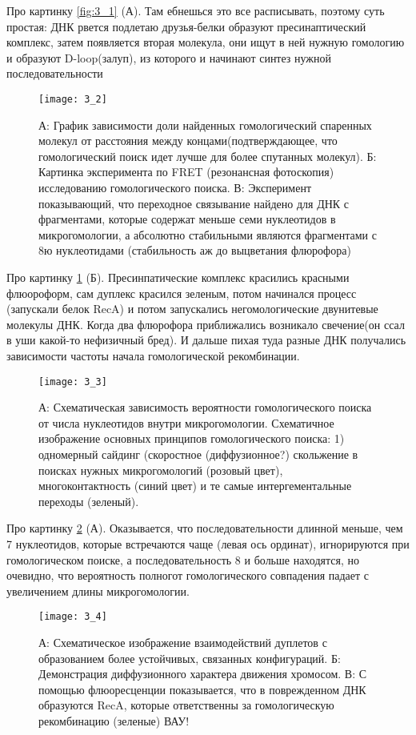 Про картинку \ref{fig:3_1}  (А). Там ебнешься это все расписывать, поэтому суть простая: ДНК рвется подлетаю друзья-белки образуют пресинаптический комплекс, затем появляется вторая молекула, они ищут в ней нужную гомологию и образуют D-loop(залуп), из которого и начинают синтез нужной последовательности

\begin{figure}[H]
	\centering
	\texttt{[image: 3\_2]}
	\caption{А: График зависимости доли найденных гомологический спаренных молекул от расстояния между концами(подтверждающее, что гомологический поиск идет лучше для более спутанных молекул). Б: Картинка эксперимента по FRET (резонансная фотоскопия) исследованию гомологического поиска. В: Эксперимент показывающий, что переходное связывание найдено для ДНК с фрагментами, которые содержат меньше семи нуклеотидов в микрогомологии, а абсолютно стабильными являются фрагментами с 8ю нуклеотидами (стабильность аж до выцветания флюрофора)}
	\label{fig:3_2}
\end{figure}

Про картинку \ref{fig:3_2} (Б). Пресинпатические комплекс красились красными флюороформ, сам дуплекс красился зеленым, потом начинался процесс (запускали белок RecA) и потом запускались негомологические двунитевые молекулы ДНК. Когда два флюрофора приближались возникало свечение(он ссал в уши какой-то нефизичный бред). И дальше пихая туда разные ДНК получались зависимости частоты начала гомологической рекомбинации.

\begin{figure}[H]
	\centering
	\texttt{[image: 3\_3]}
	\caption{А: Схематическая зависимость вероятности гомологического поиска от числа нуклеотидов внутри микрогомологии. Схематичное изображение основных принципов гомологического поиска: 1) одномерный сайдинг (скоростное (диффузионное?) скольжение в поисках нужных микрогомологий (розовый цвет), многоконтактность (синий цвет) и те самые интергементальные переходы (зеленый).}
	\label{fig:3_3}
\end{figure}

Про картинку \ref{fig:3_3} (А). Оказывается, что последовательности длинной меньше, чем 7 нуклеотидов, которые встречаются чаще (левая ось ординат), игнорируются при гомологическом поиске, а последовательность 8 и больше находятся, но очевидно, что вероятность полногот гомологического совпадения падает с увеличением длины микрогомологии.

\begin{figure}[H]
	\centering
	\texttt{[image: 3\_4]}
	\caption{А: Схематическое изображение взаимодействий дуплетов с образованием более устойчивых, связанных конфигураций. Б: Демонстрация диффузионного характера движения хромосом. В: С помощью флюоресценции показывается, что в поврежденном ДНК образуются RecA, которые ответственны за гомологическую рекомбинацию (зеленые) ВАУ!}
	\label{fig:3_4}
\end{figure}